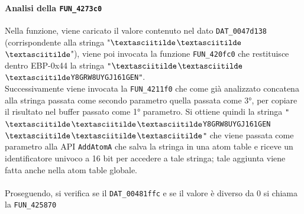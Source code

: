 \documentclass[12pt]{extarticle}
\begin{document}
\paragraph{Analisi della \texttt{FUN\_4273c0}} Nella funzione, viene caricato il valore contenuto nel dato \texttt{DAT\_0047d138} (corrispondente alla stringa "$\textasciitilde$$\textasciitilde$$\textasciitilde$"), viene poi invocata la funzione \texttt{FUN\_420fc0} che restituisce dentro EBP-0x44 la stringa \texttt{"$\textasciitilde$$\textasciitilde$$\textasciitilde$Y8GRW8UYGJ161GEN"}.\\Successivamente viene invocata la \texttt{FUN\_4211f0} che come già analizzato concatena alla stringa passata come secondo parametro quella passata come 3°, per copiare il risultato nel buffer passato come 1° parametro. Si ottiene quindi la stringa \texttt{"$\textasciitilde$$\textasciitilde$$\textasciitilde$Y8GRW8UYGJ161GEN$\textasciitilde$$\textasciitilde$$\textasciitilde$"} che viene passata come parametro alla API \texttt{AddAtomA} che salva la stringa in una atom table e riceve un identificatore univoco a 16 bit per accedere a tale stringa; tale aggiunta viene fatta anche nella atom table globale.\\\\Proseguendo, si verifica se il \texttt{DAT\_00481ffc} e se il valore è diverso da 0 si chiama la \texttt{FUN\_425870}
\end{document}
